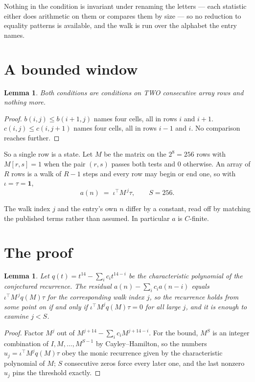 \documentclass[11pt,a4paper]{article}
\theoremstyle{plain}
\newtheorem{lemma}[theorem]{Lemma}
\theoremstyle{definition}
\begin{document}
Nothing in the condition is invariant under renaming the letters --- each statistic either does
arithmetic on them or compares them by size --- so no reduction to equality patterns is
available, and the walk is run over the alphabet the entry names.

\section{A bounded window}

\begin{lemma}\label{lem:win}
Both conditions are conditions on TWO consecutive array rows and nothing more.
\end{lemma}

\begin{proof}
$b(i,j)\le b(i{+}1,j)$ names four cells, all in rows $i$ and $i+1$. $c(i,j)\le c(i,j{+}1)$
names four cells, all in rows $i-1$ and $i$. No comparison reaches further.
\end{proof}

So a single row is a state. Let $M$ be the matrix on the $2^{8}=256$ rows with
$M[r,s]=1$ when the pair $(r,s)$ passes both tests and $0$ otherwise. An array of $R$ rows is a
walk of $R-1$ steps and every row may begin or end one, so with $\iota=\tau=\mathbf{1}$,
\[
a(n)\;=\;\iota^{\!\top}M^{\,j}\tau ,\qquad S=256.
\]

The walk index $j$ and the entry's own $n$ differ by a constant, read off by matching the
published terms rather than assumed. In particular $a$ is $C$-finite.

\section{The proof}

\begin{lemma}\label{lem:crit}
Let $q(t)=t^{14}-\sum_i c_it^{14-i}$ be the characteristic polynomial of the
conjectured recurrence. The residual $a(n)-\sum_ic_ia(n-i)$ equals
$\iota^{\!\top}M^{\,j}q(M)\tau$ for the corresponding walk index $j$, so the recurrence
holds from some point on if and only if $\iota^{\!\top}M^{j}q(M)\tau=0$ for all large $j$,
and it is enough to examine $j<S$.
\end{lemma}

\begin{proof}
Factor $M^{j}$ out of $M^{j+14}-\sum_ic_iM^{j+14-i}$. For the bound, $M^{S}$
is an integer combination of $I,M,\dots,M^{S-1}$ by Cayley--Hamilton, so the numbers
$u_j=\iota^{\!\top}M^{j}q(M)\tau$ obey the monic recurrence given by the characteristic
polynomial of $M$; $S$ consecutive zeros force every later one, and the last nonzero $u_j$
pins the threshold exactly.
\end{proof}
\end{document}
